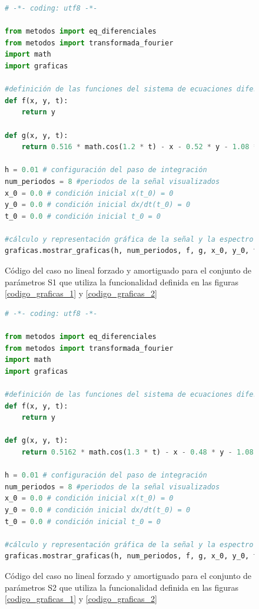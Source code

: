 \documentclass[11pt]{article}
\begin{document}
\begin{figure}
\begin{lstlisting}[language=Python]
# -*- coding: utf8 -*- 

from metodos import eq_diferenciales
from metodos import transformada_fourier
import math
import graficas

#definición de las funciones del sistema de ecuaciones diferenciales
def f(x, y, t):
	return y

def g(x, y, t):
	return 0.516 * math.cos(1.2 * t) - x - 0.52 * y - 1.08 * (x * x)

h = 0.01 # configuración del paso de integración
num_periodos = 8 #periodos de la señal visualizados
x_0 = 0.0 # condición inicial x(t_0) = 0
y_0 = 0.0 # condición inicial dx/dt(t_0) = 0
t_0 = 0.0 # condición inicial t_0 = 0

#cálculo y representación gráfica de la señal y la espectro de potencias
graficas.mostrar_graficas(h, num_periodos, f, g, x_0, y_0, t_0, 'oscilador no lineal forzado y amortiguado - S1', 'memoria/caso_anarmonico_s1.pdf')
\end{lstlisting}
\caption{Código del caso no lineal forzado y amortiguado para el conjunto de parámetros S1 que utiliza la funcionalidad definida en las
figuras \ref{codigo_graficas_1} y \ref{codigo_graficas_2}}
\end{figure}

\begin{figure}
\begin{lstlisting}[language=Python]
# -*- coding: utf8 -*- 

from metodos import eq_diferenciales
from metodos import transformada_fourier
import math
import graficas

#definición de las funciones del sistema de ecuaciones diferenciales
def f(x, y, t):
	return y

def g(x, y, t):
	return 0.5162 * math.cos(1.3 * t) - x - 0.48 * y - 1.08 * (x * x)

h = 0.01 # configuración del paso de integración
num_periodos = 8 #periodos de la señal visualizados
x_0 = 0.0 # condición inicial x(t_0) = 0
y_0 = 0.0 # condición inicial dx/dt(t_0) = 0
t_0 = 0.0 # condición inicial t_0 = 0

#cálculo y representación gráfica de la señal y la espectro de potencias
graficas.mostrar_graficas(h, num_periodos, f, g, x_0, y_0, t_0, 'oscilador no lineal forzado y amortiguado - S2', 'memoria/caso_anarmonico_s2.pdf')
\end{lstlisting}
\caption{Código del caso no lineal forzado y amortiguado para el conjunto de parámetros S2 que utiliza la funcionalidad definida en las
figuras \ref{codigo_graficas_1} y \ref{codigo_graficas_2}}
\end{figure}
\end{document}
